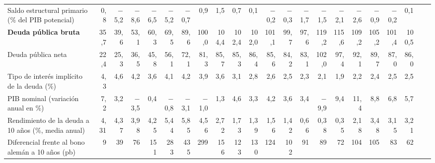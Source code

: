 \begin{tabular}{@{}>{\raggedright\arraybackslash}p{\dimexpr\anchoetq-\tabcolsep\relax}*{21}{N}@{}}
Saldo estructural primario (\% del PIB potencial) & 0{,}8 & $-$5{,}2 & $-$8{,}6 & $-$6{,}5 & $-$5{,}2 & $-$0{,}7 & 0{,}9 & 1{,}5 & 0{,}7 & 0{,}1 & $-$0{,}2 & $-$0{,}3 & $-$1{,}7 & $-$1{,}5 & $-$2{,}1 & $-$2{,}6 & $-$0{,}9 & $-$0{,}2 & 0{,}1 &  &  \\
\textbf{Deuda pública bruta} & 35{,}7 & 39{,}6 & 53{,}1 & 60{,}3 & 69{,}5 & 89{,}6 & 100{,}0 & 104{,}4 & 102{,}4 & 102{,}0 & 101{,}1 & 99{,}7 & 97{,}6 & 119{,}2 & 115{,}6 & 109{,}2 & 105{,}2 & 101{,}4 & 100{,}5 &  &  \\
Deuda pública neta & 22{,}4 & 25{,}3 & 36{,}5 & 45{,}8 & 56{,}1 & 72{,}1 & 81{,}3 & 85{,}7 & 85{,}3 & 86{,}4 & 85{,}6 & 84{,}2 & 83{,}1 & 102{,}0 & 97{,}4 & 92{,}1 & 89{,}7 & 87{,}0 & 86{,}0 &  &  \\
Tipo de interés implícito de la deuda (\%) & 4{,}3 & 4{,}6 & 4{,}2 & 3{,}6 & 4{,}1 & 4{,}2 & 3{,}9 & 3{,}6 & 3{,}1 & 2{,}8 & 2{,}6 & 2{,}5 & 2{,}3 & 2{,}1 & 1{,}9 & 2{,}2 & 2{,}4 & 2{,}5 & 2{,}5 &  &  \\
PIB nominal (variación anual en \%) & 7{,}2 & 3{,}2 & $-$3{,}5 & 0{,}4 & $-$0{,}8 & $-$3{,}1 & $-$1{,}0 & 1{,}3 & 4{,}6 & 3{,}3 & 4{,}2 & 3{,}6 & 3{,}4 & $-$9{,}9 & 9{,}4 & 11{,}4 & 8{,}8 & 6{,}8 & 5{,}7 &  &  \\
Rendimiento de la deuda a 10 años (\%, media anual) & 4{,}31 & 4{,}37 & 3{,}98 & 4{,}25 & 5{,}44 & 5{,}85 & 4{,}56 & 2{,}72 & 1{,}73 & 1{,}39 & 1{,}56 & 1{,}42 & 0{,}66 & 0{,}38 & 0{,}35 & 2{,}18 & 3{,}48 & 3{,}15 & 3{,}21 &  &  \\
Diferencial frente al bono alemán a 10 años (pb) & 9 & 39 & 76 & 151 & 283 & 435 & 299 & 156 & 123 & 130 & 124 & 102 & 91 & 89 & 72 & 104 & 105 & 83 & 62 &  &  \\
\bottomrule
\end{tabular}
